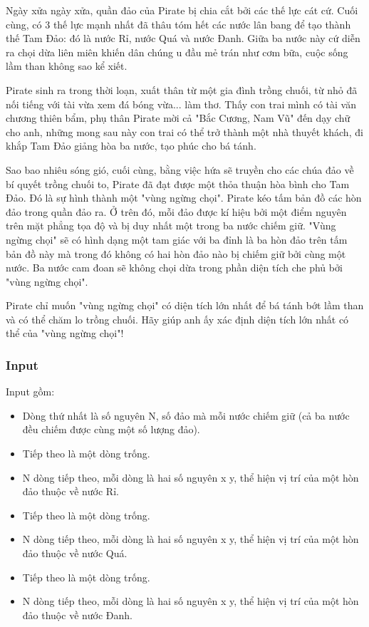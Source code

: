 



   Ngày xửa ngày xửa, quần đảo của Pirate bị chia cắt bởi các thế lực cát cứ. Cuối cùng, có 3 thế lực mạnh nhất đã thâu tóm hết các nước lân bang để tạo thành thế Tam Đảo: đó là nước Rỉ, nước Quá và nước Đanh. Giữa ba nước này cứ diễn ra chọi dừa liên miên khiến dân chúng u đầu mẻ trán như cơm bữa, cuộc sống lầm than không sao kể xiết.  

   Pirate sinh ra trong thời loạn, xuất thân từ một gia đình trồng chuối, từ nhỏ đã nối tiếng với tài vừa xem đá bóng vừa... làm thơ. Thấy con trai mình có tài văn chương thiên bẩm, phụ thân Pirate mời cả "Bắc Cương, Nam Vũ" đến dạy chữ cho anh, những mong sau này con trai có thể trở thành một nhà thuyết khách, đi khắp Tam Đảo giảng hòa ba nước, tạo phúc cho bá tánh.  

   Sao bao nhiêu sóng gió, cuối cùng, bằng việc hứa sẽ truyền cho các chúa đảo về bí quyết trồng chuối to, Pirate đã đạt được một thỏa thuận hòa bình cho Tam Đảo. Đó là sự hình thành một "vùng ngừng chọi". Pirate kéo tấm bản đồ các hòn đảo trong quần đảo ra. Ở trên đó, mỗi đảo được kí hiệu bởi một điểm nguyên trên mặt phẳng tọa độ và bị duy nhất một trong ba nước chiếm giữ. "Vùng ngừng chọi" sẽ có hình dạng một tam giác với ba đỉnh là ba hòn đảo trên tấm bản đồ này mà trong đó không có hai hòn đảo nào bị chiếm giữ bởi cùng một nước. Ba nước cam đoan sẽ không chọi dừa trong phần diện tích che phủ bởi "vùng ngừng chọi".  

   Pirate chỉ muốn "vùng ngừng chọi" có diện tích lớn nhất để bá tánh bớt lầm than và có thể chăm lo trồng chuối. Hãy giúp anh ấy xác định diện tích lớn nhất có thể của "vùng ngừng chọi"!  

\subsubsection{   Input  }

   Input gồm:  
\begin{itemize}
	\item     Dòng thứ nhất là số nguyên N, số đảo mà mỗi nước chiếm giữ (cả ba nước đều chiếm được cùng một số lượng đảo).   
	\item     Tiếp theo là một dòng trống.   
	\item     N dòng tiếp theo, mỗi dòng là hai số nguyên x y, thể hiện vị trí của một hòn đảo thuộc về nước Rỉ.   
	\item     Tiếp theo là một dòng trống.   
	\item     N dòng tiếp theo, mỗi dòng là hai số nguyên x y, thể hiện vị trí của một hòn đảo thuộc về nước Quá.   
	\item     Tiếp theo là một dòng trống.   
	\item     N dòng tiếp theo, mỗi dòng là hai số nguyên x y, thể hiện vị trí của một hòn đảo thuộc về nước Đanh.   
\end{itemize}

